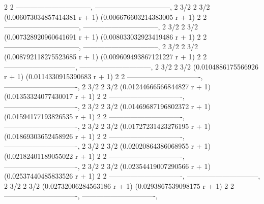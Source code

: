 \documentclass[a4paper,10pt]{article}
\begin{document}
\begin{eulernotebook}
\begin{euleroutput}
                 2                                 2
  --------------------------------, --------------------------------, 
                         2     3/2                         2     3/2
  (0.006073034857414381 r  + 1)     (0.006676603214383005 r  + 1)
                 2                                 2
  --------------------------------, --------------------------------, 
                         2     3/2                         2     3/2
  (0.007328920960641691 r  + 1)     (0.008033032923419486 r  + 1)
                 2                                 2
  --------------------------------, --------------------------------, 
                         2     3/2                         2     3/2
  (0.008792118275523685 r  + 1)     (0.009609493867121227 r  + 1)
                2                               2
  ------------------------------, ------------------------------, 
                       2     3/2                       2     3/2
  (0.0104886175566926 r  + 1)     (0.0114330915390683 r  + 1)
                 2                                2
  -------------------------------, -------------------------------, 
                        2     3/2                        2     3/2
  (0.01244666566844827 r  + 1)     (0.01353324077430017 r  + 1)
                 2                                2
  -------------------------------, -------------------------------, 
                        2     3/2                        2     3/2
  (0.01469687196802372 r  + 1)     (0.01594177193826535 r  + 1)
                 2                                2
  -------------------------------, -------------------------------, 
                        2     3/2                        2     3/2
  (0.01727231423276195 r  + 1)     (0.01869303652458926 r  + 1)
                 2                                2
  -------------------------------, -------------------------------, 
                        2     3/2                        2     3/2
  (0.02020864386068955 r  + 1)     (0.02182401189055022 r  + 1)
                 2                                2
  -------------------------------, -------------------------------, 
                        2     3/2                        2     3/2
  (0.02354419007290566 r  + 1)     (0.02537440485833526 r  + 1)
                 2                               2
  -------------------------------, ------------------------------, 
                        2     3/2                       2     3/2
  (0.02732006284563186 r  + 1)     (0.0293867539098175 r  + 1)
                 2                                2
  -------------------------------, -------------------------------, 

\end{euleroutput}
\end{eulernotebook}
\end{document}
